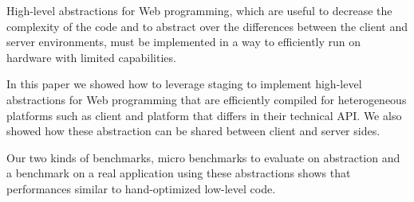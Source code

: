 \documentclass[preprint]{sigplanconf}
\begin{document}
High-level abstractions for Web programming, which are useful to decrease the complexity of the code
and to abstract over the differences between the client and server environments, must be implemented
in a way to efficiently run on hardware with limited capabilities.

In this paper we showed how to leverage staging to implement high-level abstractions for Web
programming that are efficiently compiled for heterogeneous platforms such as client and platform that differs in their technical API. 
We also showed  how these abstraction can be shared between client and server sides.

Our two kinds of benchmarks, micro benchmarks to evaluate on abstraction and a benchmark on a real application using these abstractions shows that performances similar to hand-optimized low-level code.



%
%
%



%
%
%
\end{document}
